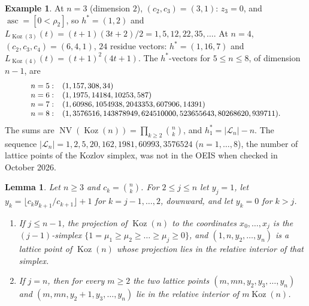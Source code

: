\documentclass[11pt, a4paper, abstract=yes]{scrartcl}
\theoremstyle{definition}
\newtheorem{mexample}[definition]{Example}
\theoremstyle{remark}
\theoremstyle{plain}
\newtheorem{lemma}[definition]{Lemma}
\theoremstyle{remark}
\theoremstyle{plain}
\newcommand{\Koz}{\operatorname{Koz}}
\newcommand{\NV}{\operatorname{NV}}
\newcommand{\asc}{\operatorname{asc}}
\newcommand{\leannone}{\tikz[baseline=-0.6ex]\draw[leannone,line width=0.6pt] (0,0) circle (0.55ex);}
\newcommand{\leanmark}[1]{\leavevmode{\reversemarginpar\marginnote{\raggedleft#1}}}
\let\autocite\cite
\begin{document}
\begin{mexample}
At \(n=3\) (dimension \(2\)), \((c_2,c_3)=(3,1)\): \(z_3=0\), and \(\asc=[0<\rho_2]\), so \(h^*=(1,2)\) and
\(L_{\Koz(3)}(t)=(t+1)(3t+2)/2=1,5,12,22,35,\dots\). At \(n=4\), \((c_2,c_3,c_4)=(6,4,1)\), \(24\) residue vectors:
\(h^*=(1,16,7)\) and \(L_{\Koz(4)}(t)=(t+1)^2(4t+1)\). The \(h^*\)-vectors for \(5\le n\le8\), of dimension \(n-1\), are
\[\small
\begin{array}{ll}
n=5: & (1,157,308,34)\\
n=6: & (1,1975,14184,10253,587)\\
n=7: & (1,60986,1054938,2043353,607906,14391)\\
n=8: & (1,3576516,143878949,624510000,523655643,80268620,939711).
\end{array}
\]
The sums are \(\NV(\Koz(n))=\prod_{k\ge2}\binom nk\), and \(h^*_1=\lvert\mathcal L_n\rvert-n\). The
sequence \(\lvert\mathcal L_n\rvert=1,2,5,20,162,1981,60993,3576524\) (\(n=1,\dots,8\)), the number of
lattice points of the Kozlov simplex, was not in the OEIS \autocite{OEIS} when checked in October 2026.
\label{ex-hstar}
\end{mexample}

\begin{lemma}
\leanmark{\leannone}Let \(n\ge3\) and \(c_k=\binom nk\). For \(2\le j\le n\) let \(y_j=1\), let
\(y_k=\lfloor c_ky_{k+1}/c_{k+1}\rfloor+1\) for \(k=j-1,\dots,2\), downward, and let \(y_k=0\) for
\(k>j\).
\begin{enumerate}
\item If \(j\le n-1\), the projection of \(\Koz(n)\) to the coordinates \(x_0,\dots,x_j\) is the
\((j-1)\)-simplex \(\lbrace1=\mu_1\ge\mu_2\ge\dots\ge\mu_j\ge0\rbrace\), and
\((1,n,y_2,\dots,y_n)\) is a lattice point of \(\Koz(n)\) whose projection lies in the relative
interior of that simplex.
\item If \(j=n\), then for every \(m\ge2\) the two lattice points \((m,mn,y_2,y_3,\dots,y_n)\) and
\((m,mn,y_2+1,y_3,\dots,y_n)\) lie in the relative interior of \(m\Koz(n)\).
\end{enumerate}
\label{lem-interior-points}
\end{lemma}
\end{document}

